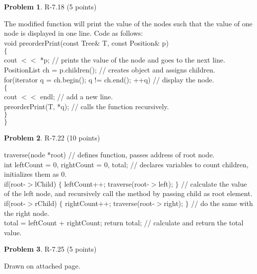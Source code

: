 \documentclass[12pt]{report}
\theoremstyle{definition}
\newtheorem{problem}{Problem}
\begin{document}
\begin{problem} 	R-7.18 (5 points) 		
\end{problem}
				The modified function will print the value of the nodes such that the value of one node is 					displayed in one line. Code as follows: \\
				
				void preorderPrint(const Tree$\&$ T, const Position$\&$ p) \\
				$\{$ \\
					cout $<<$ *p;  // prints the value of the node and goes to the next line. \\
					PositionList ch = p.children();  // creates object and assigns children. \\
					for(iterator q = ch.begin(); q != ch.end(); ++q)  // display the node. \\
					$\{$ \\
					cout $<<$ endl;  // add a new line. \\
					preorderPrint(T, *q);  // calls the function recursively. \\
					$\}$ \\
				$\}$ 

\begin{problem} 	R-7.22 (10 points) 		
\end{problem}
				traverse(node *root) // defines function, passes address of root node. \\
				int leftCount = 0, rightCount = 0, total; // declares variables to count children, initializes them 					as 0. \\
				if(root-$>$lChild) $\{$ leftCount++; traverse(root-$>$left); $\}$ // calculate the value of the left 					node, and recursively call the method by passing child as root element. \\
				if(root-$>$rChild) $\{$ rightCount++; traverse(root-$>$right); $\}$ // do the same with the right 					node. \\
				total = leftCount + rightCount; return total; // calculate and return the total value.

\begin{problem} 	R-7.25 (5 points) 		
\end{problem}
				Drawn on attached page.
				
\end{document}
